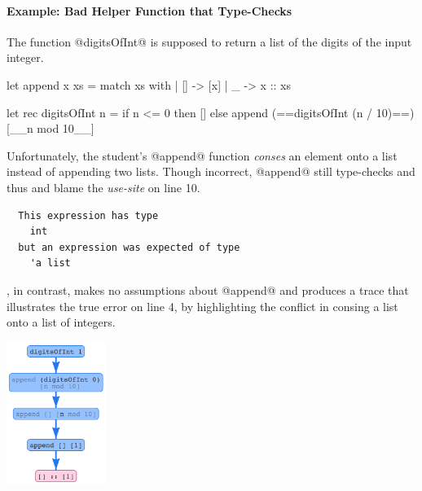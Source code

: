\paragraph{Example: Bad Helper Function that Type-Checks}
%
The function @digitsOfInt@ is supposed to return a list of
the digits of the input integer.
%
\begin{ecode}
  let append x xs =
    match xs with
    | [] -> [x]
    | _  -> x :: xs

  let rec digitsOfInt n =
    if n <= 0 then
      []
    else
      append (==digitsOfInt (n / 10)==)
             [__n mod 10__]
\end{ecode}
%
Unfortunately, the student's @append@ function \emph{conses} an element
onto a list instead of appending two lists.
%
Though incorrect, @append@ still type-checks and thus \ocaml and
\sherrloc blame the \emph{use-site} on line 10.
%
\begin{verbatim}
  This expression has type
    int
  but an expression was expected of type
    'a list
\end{verbatim}
%
\toolname, in contrast, makes no assumptions about @append@ and produces
a trace that illustrates the true error on line 4, by
highlighting the conflict in consing a list onto a list of integers.
%
\begin{center}
  \includegraphics[height=175px]{digitsOfInt.png}
\end{center}
%


